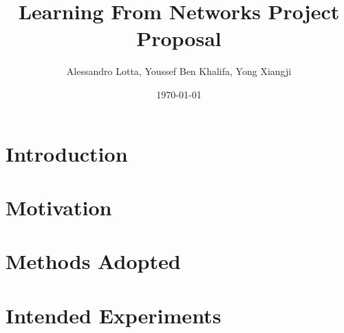 
\title{Learning From Networks Project Proposal}
\author{Alessandro Lotta, Youssef Ben Khalifa, Yong Xiangji}
\date{\today}

\maketitle \tableofcontents 
\listofalgorithms
\newpage
\section{Introduction}

\section{Motivation}

\section{Methods Adopted}

\section{Intended Experiments}

